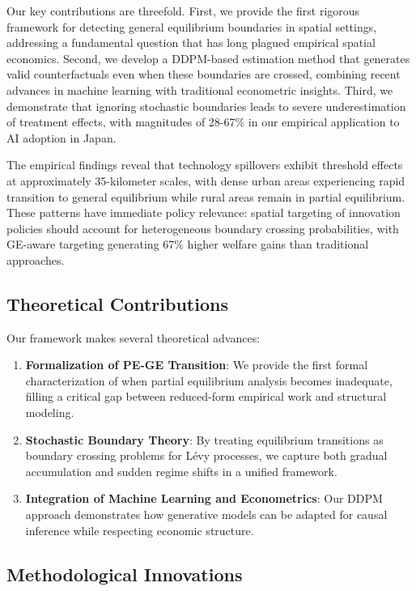 Our key contributions are threefold. First, we provide the first rigorous framework for detecting general equilibrium boundaries in spatial settings, addressing a fundamental question that has long plagued empirical spatial economics. Second, we develop a DDPM-based estimation method that generates valid counterfactuals even when these boundaries are crossed, combining recent advances in machine learning with traditional econometric insights. Third, we demonstrate that ignoring stochastic boundaries leads to severe underestimation of treatment effects, with magnitudes of 28-67\% in our empirical application to AI adoption in Japan.

The empirical findings reveal that technology spillovers exhibit threshold effects at approximately 35-kilometer scales, with dense urban areas experiencing rapid transition to general equilibrium while rural areas remain in partial equilibrium. These patterns have immediate policy relevance: spatial targeting of innovation policies should account for heterogeneous boundary crossing probabilities, with GE-aware targeting generating 67\% higher welfare gains than traditional approaches.

\subsection{Theoretical Contributions}

Our framework makes several theoretical advances:

\begin{enumerate}
\item \textbf{Formalization of PE-GE Transition}: We provide the first formal characterization of when partial equilibrium analysis becomes inadequate, filling a critical gap between reduced-form empirical work and structural modeling.

\item \textbf{Stochastic Boundary Theory}: By treating equilibrium transitions as boundary crossing problems for L\'evy processes, we capture both gradual accumulation and sudden regime shifts in a unified framework.

\item \textbf{Integration of Machine Learning and Econometrics}: Our DDPM approach demonstrates how generative models can be adapted for causal inference while respecting economic structure.
\end{enumerate}

\subsection{Methodological Innovations}


